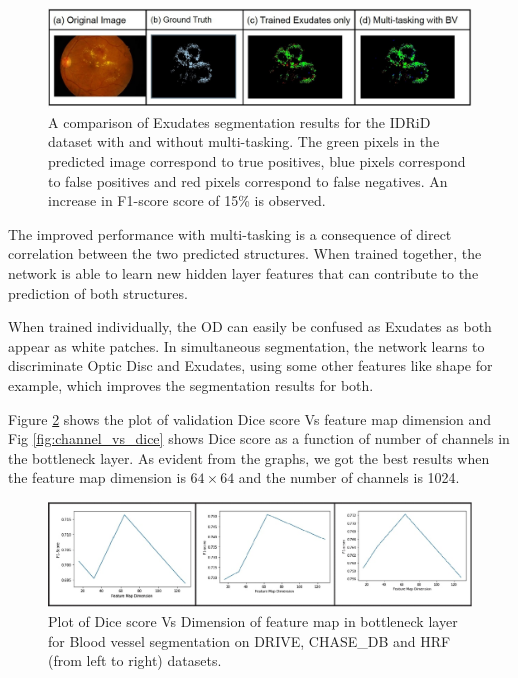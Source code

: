 \documentclass[utf8]{FrontiersinHarvard} %
\begin{document}
\begin{figure}[h!]
\begin{center}
\includegraphics[width=15cm]{images/exudates_results.jpg}%
\end{center}
\caption{A comparison of Exudates segmentation results for the IDRiD dataset with and without multi-tasking. The green pixels in the predicted image correspond to true positives, blue pixels correspond to false positives and  red pixels correspond to false negatives. An increase in F1-score score of 15\% is observed.}
\label{fig:exudates_segmentation_results}
\end{figure}

The improved performance with multi-tasking is a consequence of direct correlation between the two predicted structures. When trained together, the network is able to learn new hidden layer features that can contribute to the prediction of both structures.

When trained individually, the OD can easily be confused as Exudates as both appear as white patches. In simultaneous segmentation, the network learns to discriminate Optic Disc and Exudates, using some other features like shape for example, which improves the segmentation results for both.

Figure \ref{fig:zdim_vs_dice} shows the plot of validation Dice score Vs feature map dimension and Fig \ref{fig:channel_vs_dice}  shows Dice score as a function of  number of channels in the bottleneck layer. As evident from the graphs, we got the best results when the feature map dimension is $64\times64$ and the number of channels is 1024.

\begin{figure}[h!]
\begin{center}
\includegraphics[width=15cm]{images/zdim_vs_dice.jpg}%
\end{center}
\caption{Plot of Dice score Vs Dimension of feature map in bottleneck layer for Blood vessel segmentation on DRIVE, CHASE\_DB and HRF (from left to right) datasets.}
\label{fig:zdim_vs_dice}
\end{figure}
\end{document}

